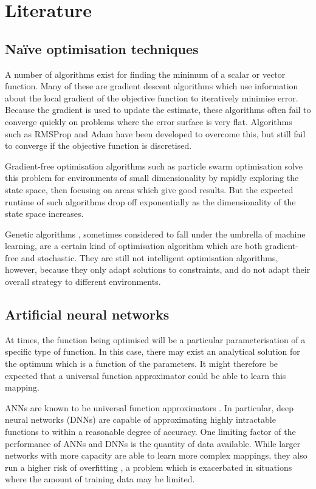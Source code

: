 \documentclass[../../main.tex]{subfiles}
\begin{document}
\chapter{Literature}

\section{Na\"{i}ve optimisation techniques}

A number of algorithms exist for finding the minimum of a scalar or vector function.
Many of these are gradient descent algorithms \cite{ruder17} which use information about the local gradient of the objective function
to iteratively minimise error.
Because the gradient is used to update the estimate, these algorithms often fail to converge quickly on problems where the error surface is very flat.
Algorithms such as RMSProp \cite{hinton17} and Adam \cite{kingma17} have been developed to overcome this, but still fail to converge if the objective function is discretised.

Gradient-free optimisation algorithms such as particle swarm optimisation \cite{kennedy12} solve this problem for environments of small dimensionality
by rapidly exploring the state space, then focusing on areas which give good results.
But the expected runtime of such algorithms drop off exponentially as the dimensionality of the state space increases.

Genetic algorithms \cite{carr14}, sometimes considered to fall under the umbrella of machine learning, are a certain kind of optimisation algorithm
which are both gradient-free and stochastic.
They are still not intelligent optimisation algorithms, however, because they only adapt solutions to constraints, and do not adapt their overall strategy to different environments.

\section{Artificial neural networks}

At times, the function being optimised will be a particular parameterisation of a specific type of function.
In this case, there may exist an analytical solution for the optimum which is a function of the parameters.
It might therefore be expected that a universal function approximator could be able to learn this mapping.

ANNs are known to be universal function approximators \cite{hornik91}.
In particular, deep neural networks (DNNs) \cite{liang17} are capable of approximating highly intractable functions to within a reasonable degree of accuracy.
One limiting factor of the performance of ANNs and DNNs is the quantity of data available.
While larger networks with more capacity are able to learn more complex mappings, they also run a higher risk of overfitting \cite{caruana01},
a problem which is exacerbated in situations where the amount of training data may be limited.
\end{document}
